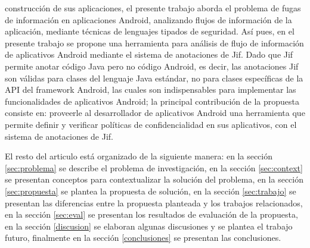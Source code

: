 construcción de sus aplicaciones, el presente trabajo aborda el problema de
fugas de información en aplicaciones Android, analizando flujos de información
de la aplicación, mediante técnicas de lenguajes tipados de seguridad.\newline
Así pues, en el presente trabajo se propone una herramienta para análisis de
flujo de información de aplicativos Android mediante el sistema de anotaciones
de Jif.\newline
Dado que Jif permite
anotar código Java pero no código Android, es decir, las anotaciones Jif son
válidas para clases del lenguaje Java estándar, no para clases específicas de la
API del framework Android, las cuales son indispensables para
implementar las funcionalidades de aplicativos Android; la principal
contribución de la propuesta consiste en: proveerle al desarrollador de
aplicativos Android una herramienta que permite definir y verificar políticas de
confidencialidad en sus aplicativos, con el sistema de anotaciones de
Jif.\newline

El resto del articulo está organizado de la siguiente manera: en la sección
\ref{sec:problema} se describe el problema de investigación, en la sección
\ref{sec:context} se presentan conceptos para contextualizar la solución del
problema, en la sección \ref{sec:propuesta} se plantea la propuesta de solución,
en la sección \ref{sec:trabajo} se presentan las diferencias entre la propuesta
planteada y los trabajos relacionados, en la sección \ref{sec:eval} se presentan
los resultados de evaluación de la propuesta, en la sección \ref{discusion} se
elaboran algunas discusiones y se plantea el trabajo futuro, finalmente en la
sección \ref{conclusiones} se presentan las conclusiones.


























